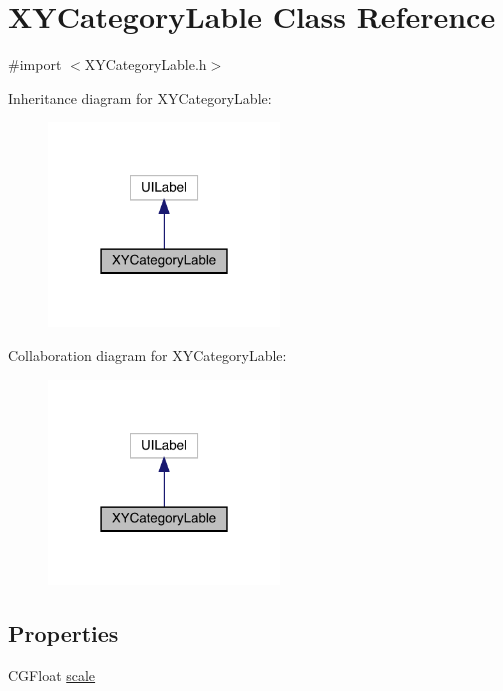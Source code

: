\hypertarget{interface_x_y_category_lable}{}\section{X\+Y\+Category\+Lable Class Reference}
\label{interface_x_y_category_lable}


{\ttfamily \#import $<$X\+Y\+Category\+Lable.\+h$>$}



Inheritance diagram for X\+Y\+Category\+Lable\+:\nopagebreak
\begin{figure}[H]
\begin{center}
\leavevmode
\includegraphics[width=174pt]{interface_x_y_category_lable__inherit__graph}
\end{center}
\end{figure}


Collaboration diagram for X\+Y\+Category\+Lable\+:\nopagebreak
\begin{figure}[H]
\begin{center}
\leavevmode
\includegraphics[width=174pt]{interface_x_y_category_lable__coll__graph}
\end{center}
\end{figure}
\subsection*{Properties}
\begin{DoxyCompactItemize}
\item 
C\+G\+Float \mbox{\hyperlink{interface_x_y_category_lable_ac62f48570e659b6d242273c40f6ba691}{scale}}
\end{DoxyCompactItemize}


